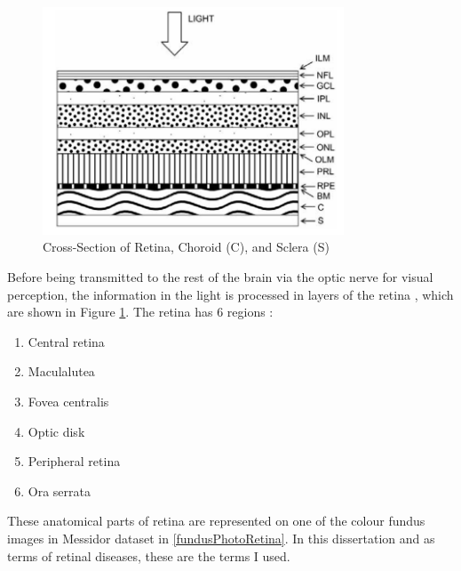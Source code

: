 \begin{figure}[t]
\centering
\includegraphics[width=0.8\textwidth]{Figures/layers_of_retina}
\caption{Cross-Section of Retina, Choroid (C), and Sclera (S) \citep[from][]{falt2012modern}}
\label{layersOfRetina}
\end{figure}


Before being transmitted to the rest of the brain via the optic nerve for visual perception, the information in the light is processed in layers of the retina \citep{kauppi2010eye}, which are shown in Figure \ref{layersOfRetina}. The retina has 6 regions \citep{forrester2015eye}:
\begin{enumerate}
    \item Central retina
    \item Maculalutea
    \item Fovea centralis
    \item Optic disk
    \item Peripheral retina
    \item Ora serrata
\end{enumerate}

These anatomical parts of retina are represented on one of the colour fundus images in Messidor dataset \citep{mookiah2015application} in \ref{fundusPhotoRetina}. In this dissertation and as terms of retinal diseases, these are the terms I used. 

